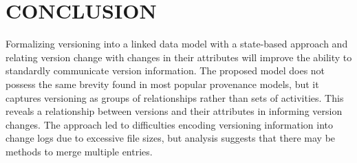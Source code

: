 \chapter{CONCLUSION}

Formalizing versioning into a linked data model with a state-based approach and relating version change with changes in their attributes will improve the ability to standardly communicate version information.
The proposed model does not possess the same brevity found in most popular provenance models, but it captures versioning as groups of relationships rather than sets of activities.
This reveals a relationship between versions and their attributes in informing version changes.
The approach led to difficulties encoding versioning information into change logs due to excessive file sizes, but analysis suggests that there may be methods to merge multiple entries.
